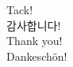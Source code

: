 \documentclass[
  9pt,
  table,
  ignorenonframetext
]{beamer}
\begin{document}
\begin{frame}[plain]
  \begin{center}
            {\LARGE Tack!}  \\\vspace{6mm}
            {\LARGE 감사합니다!}\\\vspace{6mm}
            {\LARGE Thank you!}  \\\vspace{6mm}
            {\LARGE Dankesch\"on!} \\\vspace{6mm}
                    {\LARGE \smiley } 
  \end{center}
  
\end{frame}
\end{document}
